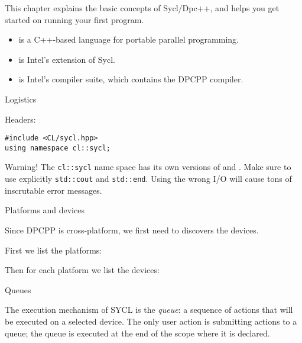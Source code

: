 
This chapter explains the basic concepts of Sycl/Dpc++,
and helps you get
started on running your first program.

\begin{itemize}
\item {} is a C++-based language for portable parallel programming.
\item {} is Intel's extension of Sycl.
\item {} is Intel's compiler suite,
  which contains the \ac{DPCPP} compiler.
\end{itemize}

 {Logistics}

Headers:
\begin{lstlisting}
#include <CL/sycl.hpp>
using namespace cl::sycl;
\end{lstlisting}

\begin{remark}
  Warning!
  The \lstinline+cl::sycl+ name space has its own versions of  and .
  Make sure to use explicitly \lstinline+std::cout+ and \lstinline+std::end+.
  Using the wrong I/O will cause tons of inscrutable error messages.
\end{remark}

 {Platforms and devices}

Since \ac{DPCPP} is cross-platform, we first need to discovers
the devices.

First we list the platforms:

Then for each platform we list the devices:

 {Queues}

The execution mechanism of SYCL is the
\emph{queue}:
a sequence of actions that will be executed on a selected device.
The only user action is submitting actions to a queue;
the queue is executed at the end of the scope where it is declared.


